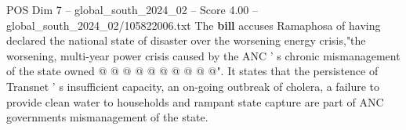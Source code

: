 \begin{textsample}{POS Dim 7 – global\_south\_2024\_02 – Score 4.00 – global\_south\_2024\_02/105822006.txt}
The \textbf{bill} accuses Ramaphosa of having declared the national state of disaster over the worsening energy crisis,"the worsening, multi-year power crisis caused by the ANC ' s chronic mismanagement of the state owned @ @ @ @ @ @ @ @ @ @".
It states that the persistence of Transnet ' s insufficient capacity, an on-going outbreak of cholera, a failure to provide clean water to households and rampant state capture are part of ANC governments mismanagement of the state.

\end{textsample}
